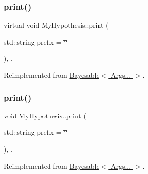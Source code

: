 \mbox{\label{class_my_hypothesis_a81fa991ffd2cabe6f71ec129ae26ca6c}} 
\subsubsection{\texorpdfstring{print()}{print()}\hspace{0.1cm}{\footnotesize\ttfamily [2/3]}}
{\footnotesize\ttfamily virtual void My\+Hypothesis\+::print (\begin{DoxyParamCaption}\item[{std\+::string}]{prefix = {\ttfamily \char`\"{}\char`\"{}} }\end{DoxyParamCaption})\hspace{0.3cm}{\ttfamily [inline]}, {\ttfamily [override]}, {\ttfamily [virtual]}}



Reimplemented from \hyperlink{class_bayesable_a87d5d9481d6a72b017e44b175071fa5e}{Bayesable$<$ Args... $>$}.

\mbox{\label{class_my_hypothesis_a91fd22a2724e04c0e7c67ea4282beac4}} 
\subsubsection{\texorpdfstring{print()}{print()}\hspace{0.1cm}{\footnotesize\ttfamily [3/3]}}
{\footnotesize\ttfamily void My\+Hypothesis\+::print (\begin{DoxyParamCaption}\item[{std\+::string}]{prefix = {\ttfamily \char`\"{}\char`\"{}} }\end{DoxyParamCaption})\hspace{0.3cm}{\ttfamily [inline]}, {\ttfamily [override]}, {\ttfamily [virtual]}}



Reimplemented from \hyperlink{class_bayesable_a87d5d9481d6a72b017e44b175071fa5e}{Bayesable$<$ Args... $>$}.

\mbox{\label{class_my_hypothesis_a536a607a2008f50fb1062fd540c60063}} 
